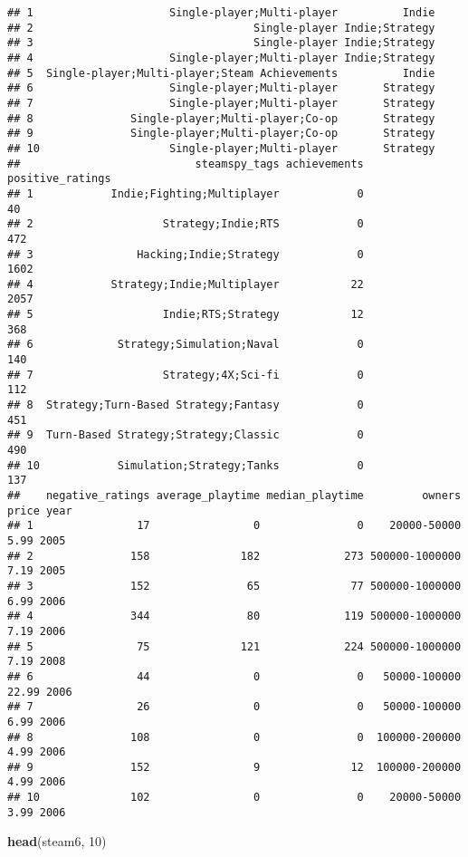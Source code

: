 \documentclass[
]{article}
\newenvironment{Shaded}{\begin{snugshade}}{\end{snugshade}}
\newcommand{\DecValTok}[1]{\textcolor[rgb]{0.00,0.00,0.81}{#1}}
\newcommand{\FunctionTok}[1]{\textcolor[rgb]{0.13,0.29,0.53}{\textbf{#1}}}
\newcommand{\NormalTok}[1]{#1}
\begin{document}
\begin{verbatim}
## 1                     Single-player;Multi-player          Indie
## 2                                  Single-player Indie;Strategy
## 3                                  Single-player Indie;Strategy
## 4                     Single-player;Multi-player Indie;Strategy
## 5  Single-player;Multi-player;Steam Achievements          Indie
## 6                     Single-player;Multi-player       Strategy
## 7                     Single-player;Multi-player       Strategy
## 8               Single-player;Multi-player;Co-op       Strategy
## 9               Single-player;Multi-player;Co-op       Strategy
## 10                    Single-player;Multi-player       Strategy
##                           steamspy_tags achievements positive_ratings
## 1            Indie;Fighting;Multiplayer            0               40
## 2                    Strategy;Indie;RTS            0              472
## 3                Hacking;Indie;Strategy            0             1602
## 4            Strategy;Indie;Multiplayer           22             2057
## 5                    Indie;RTS;Strategy           12              368
## 6             Strategy;Simulation;Naval            0              140
## 7                    Strategy;4X;Sci-fi            0              112
## 8  Strategy;Turn-Based Strategy;Fantasy            0              451
## 9  Turn-Based Strategy;Strategy;Classic            0              490
## 10            Simulation;Strategy;Tanks            0              137
##    negative_ratings average_playtime median_playtime         owners price year
## 1                17                0               0    20000-50000  5.99 2005
## 2               158              182             273 500000-1000000  7.19 2005
## 3               152               65              77 500000-1000000  6.99 2006
## 4               344               80             119 500000-1000000  7.19 2006
## 5                75              121             224 500000-1000000  7.19 2008
## 6                44                0               0   50000-100000 22.99 2006
## 7                26                0               0   50000-100000  6.99 2006
## 8               108                0               0  100000-200000  4.99 2006
## 9               152                9              12  100000-200000  4.99 2006
## 10              102                0               0    20000-50000  3.99 2006
\end{verbatim}

\begin{Shaded}
\begin{Highlighting}[]
\FunctionTok{head}\NormalTok{(steam6, }\DecValTok{10}\NormalTok{)}
\end{Highlighting}
\end{Shaded}
\end{document}
